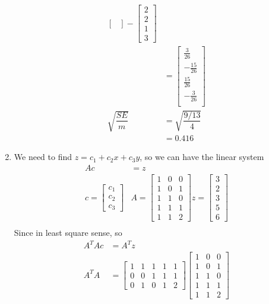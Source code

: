 \documentclass{article}
\begin{document}
\begin{enumerate}
\begin{align*}
\begin{bmatrix}
\end{bmatrix}-\begin{bmatrix}
2\\2\\1\\3
\end{bmatrix}\\
&=\begin{bmatrix}
\frac{3}{26}\\
-\frac{15}{26}\\
\frac{15}{26}\\
-\frac{3}{26}\\
\end{bmatrix}\\
\sqrt{\dfrac{SE}{m}}&=\sqrt{\dfrac{9/13}{4}}\\
&=0.416
\end{align*}
\item
We need to find $z = c_1+c_2x+c_3y$, so we can have the linear system\begin{align*}
Ac&=z\\
c=\begin{bmatrix}
c_1\\c_2\\c_3
\end{bmatrix}
&A=\begin{bmatrix}
1&0&0\\1&0&1\\1&1&0\\1&1&1\\1&1&2
\end{bmatrix} z=\begin{bmatrix}
3\\2\\3\\5\\6
\end{bmatrix}\\
\end{align*}
Since in least square sense, so \begin{align*}
A^TAc &=A^Tz\\
A^TA&=\begin{bmatrix}
1&1&1&1&1\\0&0&1&1&1\\0&1&0&1&2
\end{bmatrix}\begin{bmatrix}
1&0&0\\1&0&1\\1&1&0\\1&1&1\\1&1&2
\end{bmatrix}\\

\end{align*}
\end{enumerate}
\end{document}
